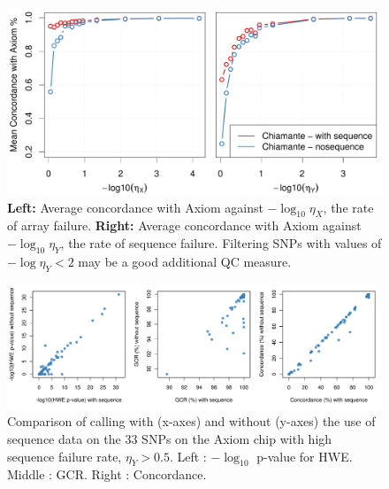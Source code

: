 \begin{figure}[p]
  \begin{center} 
    \includegraphics[width=\textwidth]{chap2figs/fail_filtering}
    \caption[Genotype concordance against rate of assay failure]{\textbf{Left:} Average concordance with Axiom against $-\log_{10} \eta_X$, the rate of array failure. \textbf{Right:} Average concordance with Axiom against $-\log_{10} \eta_Y$, the rate of sequence failure. Filtering SNPs with values of $-\log \eta_Y < 2$ may be a good additional QC measure.     \label{fail_filtering}}
  \end{center} 
\end{figure}

\begin{figure}[p]
  \begin{center} 
    \includegraphics[width=\textwidth]{chap2figs/SupFig10}
    \caption[Evaluation of genotype calling when sequence data is problematic]{Comparison of calling with (x-axes) and without (y-axes) the use of sequence data on the 33 SNPs on the Axiom chip with high sequence failure rate, $\eta_Y > 0.5$. Left :  $-\log_10$ p-value for HWE. Middle : GCR. Right : Concordance.
      \label{chap2:results:eta_seq} }
  \end{center} 
\end{figure}


